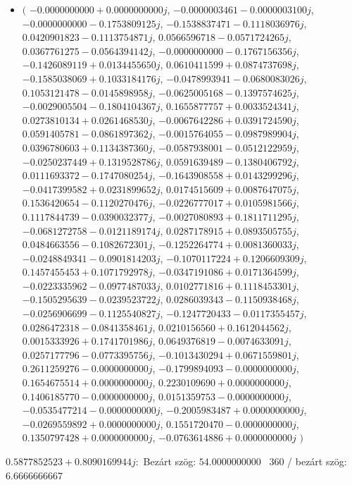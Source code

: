 \documentclass[14pt,a4paper]{article}
\begin{document}
\begin{itemize}
\item
$\big($
$-0.0000000000+0.0000000000j$, $-0.0000003461-0.0000003100j$, $-0.0000000000-0.1753809125j$, $-0.1538837471-0.1118036976j$, $0.0420901823-0.1113754871j$, $0.0566596718-0.0571724265j$, $0.0367761275-0.0564394142j$, $-0.0000000000-0.1767156356j$, $-0.1426089119+0.0134455650j$, $0.0610411599+0.0874737698j$, $-0.1585038069+0.1033184176j$, $-0.0478993941-0.0680083026j$, $0.1053121478-0.0145898958j$, $-0.0625005168-0.1397574625j$, $-0.0029005504-0.1804104367j$, $0.1655877757+0.0033524341j$, $0.0273810134+0.0261468530j$, $-0.0067642286+0.0391724590j$, $0.0591405781-0.0861897362j$, $-0.0015764055-0.0987989904j$, $0.0396780603+0.1134387360j$, $-0.0587938001-0.0512122959j$, $-0.0250237449+0.1319528786j$, $0.0591639489-0.1380406792j$, $0.0111693372-0.1747080254j$, $-0.1643908558+0.0143299296j$, $-0.0417399582+0.0231899652j$, $0.0174515609+0.0087647075j$, $0.1536420654-0.1120270476j$, $-0.0226777017+0.0105981566j$, $0.1117844739-0.0390032377j$, $-0.0027080893+0.1811711295j$, $-0.0681272758-0.0121189174j$, $0.0287178915+0.0893505755j$, $0.0484663556-0.1082672301j$, $-0.1252264774+0.0081360033j$, $-0.0248849341-0.0901814203j$, $-0.1070117224+0.1206609309j$, $0.1457455453+0.1071792978j$, $-0.0347191086+0.0171364599j$, $-0.0223335962-0.0977487033j$, $0.0102771816+0.1118453301j$, $-0.1505295639-0.0239523722j$, $0.0286039343-0.1150938468j$, $-0.0256906699-0.1125540827j$, $-0.1247720433-0.0117355457j$, $0.0286472318-0.0841358461j$, $0.0210156560+0.1612044562j$, $0.0015333926+0.1741701986j$, $0.0649376819-0.0074633091j$, $0.0257177796-0.0773395756j$, $-0.1013430294+0.0671559801j$, $0.2611259276-0.0000000000j$, $-0.1799894093-0.0000000000j$, $0.1654675514+0.0000000000j$, $0.2230109690+0.0000000000j$, $0.1406185770-0.0000000000j$, $0.0151359753-0.0000000000j$, $-0.0535477214-0.0000000000j$, $-0.2005983487+0.0000000000j$, $-0.0269559892+0.0000000000j$, $0.1551720470-0.0000000000j$, $0.1350797428+0.0000000000j$, $-0.0763614886+0.0000000000j$
$\big)$
\end{itemize}
$0.5877852523+0.8090169944j$:\
Bezárt szög: $54.0000000000$ \
360 / bezárt szög: $6.6666666667$\
\end{document}
